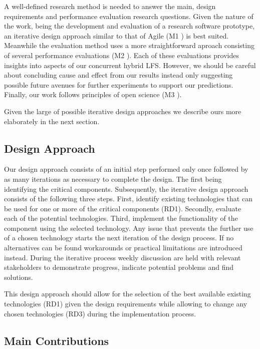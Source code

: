 A well-defined research method is needed to answer the main, design requirements
and performance evaluation research questions. Given the nature of the work,
being the development and evaluation of a research software prototype, an
iterative design approach similar to that of Agile
(M1 \cite{Schwaber2001AgileSD}) is best suited. Meanwhile the evaluation method
uses a more straightforward aproach consisting of several performance
evaluations (M2 \cite{Jain1991TheAO}). Each of these evaluations provides
insights into aspects of our concurrent hybrid LFS. However, we should
be careful about concluding cause and effect from our results instead only
suggesting possible future avenues for further experiments to support our
predictions. Finally, our work follows principles of open science
(M3 \cite{Wilkinson2016TheFG}).

Given the large of possible iterative design approaches we describe ours
more elaborately in the next section.

\subsection{Design Approach}

Our design approach consists of an initial step performed only once followed by
as many iterations as necessary to complete the design. The first being
identifying the critical components. Subsequently, the iterative design approach
consists of the following three steps. First, identify existing technologies
that can be used for one or more of the critical components (RD1). Secondly,
evaluate each of the potential technologies. Third, implement the
functionality of the component using the selected technology. Any issue that
prevents the further use of a chosen technology starts the next iteration of the
design process. If no alternatives can be found workarounds or practical
limitations are introduced instead. During the iterative process weekly
discussion are held with relevant stakeholders to demonstrate progress, indicate
potential problems and find solutions.

This design approach should allow for the selection of the best available
existing technologies (RD1) given the design requirements while allowing to
change any chosen technologies (RD3) during the implementation process.

\subsection{Main Contributions}

